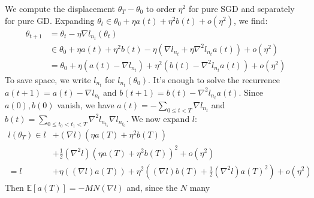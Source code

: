 \documentclass[openany, notitlepage, justified]{tufte-book}
\theoremstyle{plain}
\theoremstyle{definition}
\newcommand{\expct}[1]{\mathbb{E}\left[#1\right]}
\begin{document}
            \begin{shaded}
                We compute the displacement $\theta_T-\theta_0$ to order $\eta^2$ 
                for pure SGD and separately for pure GD.  Expanding
                $
                    \theta_t \in \theta_0 + \eta a(t) + \eta^2 b(t) + o(\eta^2)
                $, we find:
                \begin{align*}
                    \theta_{t+1} &=     \theta_t - \eta \nabla l_{n_t} (\theta_t) \\
                                 &\in       \theta_0
                                        +   \eta a(t) + \eta^2 b(t)
                                        -   \eta (
                                                    \nabla l_{n_t}
                                                +   \eta \nabla^2 l_{n_t} a(t) 
                                            )
                                        +   o(\eta^2) \\
                                 &=     \theta_0
                                    +   \eta (a(t) - \nabla l_{n_t})
                                    +   \eta^2 (b(t) - \nabla^2 l_{n_t} a(t)) 
                                    +   o(\eta^2)
                \end{align*}
                To save space, we write $l_{n_t}$ for $l_{n_t}(\theta_0)$.  It's
                enough to solve the recurrence $a(t+1) = a(t) - \nabla l_{n_t}$ and
                $b(t+1) = b(t) - \nabla^2 l_{n_t} a(t)$.  Since $a(0), b(0)$
                vanish, we have $a(t) =-\sum_{0\leq t<T} \nabla l_{n_t}$ and $b(t)
                = \sum_{0\leq t_0 < t_1 < T} \nabla^2 l_{n_{t_1}} \nabla
                l_{n_{t_0}}$.  We now expand $l$:
                \begin{align*}
                    l(\theta_T) \in    l   &+   (\nabla l) (\eta a(T) + \eta^2 b(T)) \\
                                           &+   \frac{1}{2} (\nabla^2 l) (\eta a(T) + \eta^2 b(T))^2
                                            +   o(\eta^2) \\
                                =      l   &+   \eta ((\nabla l) a(T))
                                            +   \eta^2 ((\nabla l) b(T) + \frac{1}{2} (\nabla^2 l) a(T)^2 )
                                            +   o(\eta^2)
                \end{align*}
                Then $\expct{a(T)} = -MN(\nabla l)$ and, since the $N$ many

\end{shaded}
\end{document}
